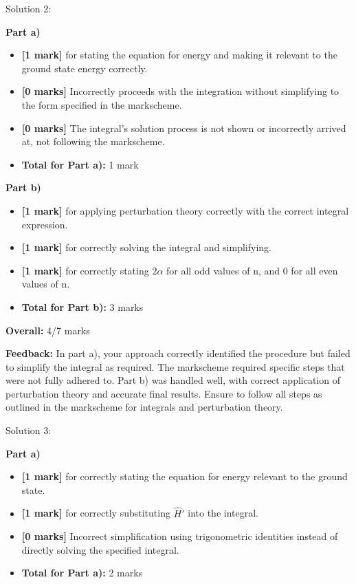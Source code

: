 \documentclass[a4paper,11pt]{article}
\begin{document}
Solution 2:

\textbf{Part a)}
\begin{itemize}
    \item \textbf{[1 mark]} for stating the equation for energy and making it relevant to the ground state energy correctly.
    \item \textbf{[0 marks]} Incorrectly proceeds with the integration without simplifying to the form specified in the markscheme.
    \item \textbf{[0 marks]} The integral's solution process is not shown or incorrectly arrived at, not following the markscheme.
    \item \textbf{Total for Part a):} 1 mark
\end{itemize}

\textbf{Part b)}
\begin{itemize}
    \item \textbf{[1 mark]} for applying perturbation theory correctly with the correct integral expression.
    \item \textbf{[1 mark]} for correctly solving the integral and simplifying.
    \item \textbf{[1 mark]} for correctly stating \(2 \alpha \) for all odd values of n, and 0 for all even values of n.
    \item \textbf{Total for Part b):} 3 marks
\end{itemize}

\textbf{Overall:} 4/7 marks

\textbf{Feedback:} In part a), your approach correctly identified the procedure but failed to simplify the integral as required. The markscheme required specific steps that were not fully adhered to. Part b) was handled well, with correct application of perturbation theory and accurate final results. Ensure to follow all steps as outlined in the markscheme for integrals and perturbation theory.

Solution 3:

\textbf{Part a)}
\begin{itemize}
    \item \textbf{[1 mark]} for correctly stating the equation for energy relevant to the ground state.
    \item \textbf{[1 mark]} for correctly substituting \( \hat{H}' \) into the integral.
    \item \textbf{[0 marks]} Incorrect simplification using trigonometric identities instead of directly solving the specified integral.
    \item \textbf{Total for Part a):} 2 marks
\end{itemize}
\end{document}
